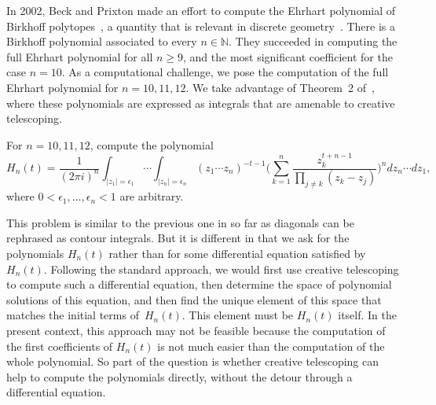 \documentclass{jssc}
\let\set\mathbb
\begin{document}
 In 2002, Beck and Prixton made an effort to compute the Ehrhart polynomial of Birkhoff polytopes~\cite{beck03}, a
 quantity that is relevant in discrete geometry~\cite{beck07}. There is a Birkhoff polynomial associated to every
 $n\in\set N$. They succeeded in computing the full Ehrhart polynomial for all $n\geq9$, and the most significant
 coefficient for the case $n=10$. As a computational challenge, we pose the computation of the
 full Ehrhart polynomial for $n=10,11,12$. We take advantage of Theorem~2 of~\cite{beck03}, where these polynomials
 are expressed as integrals that are amenable to creative telescoping.
 \begin{problem}
   For $n=10,11,12$, compute the polynomial
   \[
   H_n(t)=\frac1{(2\pi i)^n}\int_{|z_1|=\epsilon_1}\cdots\int_{|z_n|=\epsilon_n} (z_1\cdots z_n)^{-t-1}
      \biggl(\sum_{k=1}^n\frac{z_k^{t+n-1}}{\prod_{j\neq k}(z_k-z_j)}\biggr)^n dz_n\cdots dz_1,
   \]
   where $0<\epsilon_1,\dots,\epsilon_n<1$ are arbitrary.
 \end{problem}
 This problem is similar to the previous one in so far as diagonals can be rephrased as contour integrals. But it
 is different in that we ask for the polynomials $H_n(t)$ rather than for some differential equation
 satisfied by~$H_n(t)$. Following the standard approach, we would first use creative telescoping to compute such
 a differential equation, then determine the space of polynomial solutions of this equation, and then find
 the unique element of this space that matches the initial terms of~$H_n(t)$. This element must be $H_n(t)$ itself.
 In the present context, this approach may not be feasible because the computation of the first coefficients of $H_n(t)$
 is not much easier than the computation of the whole polynomial. So part of the question is whether creative telescoping
 can help to compute the polynomials directly, without the detour through a differential equation.





%
%
\end{document}
